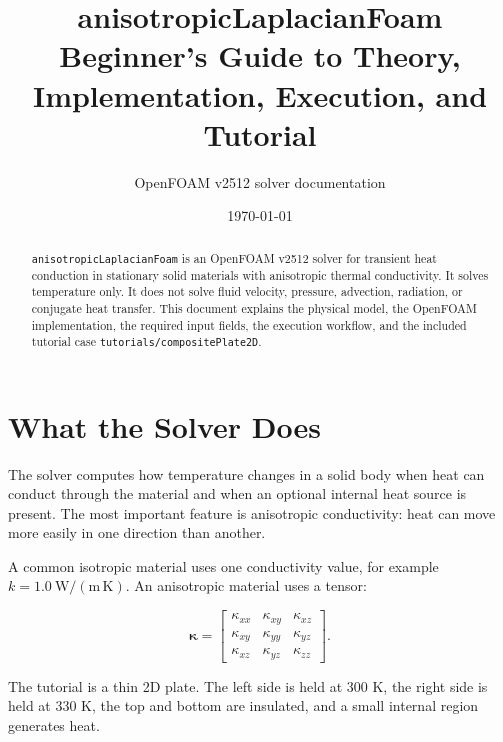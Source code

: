 \documentclass[11pt,a4paper]{article}
\title{\textbf{anisotropicLaplacianFoam}\\
Beginner's Guide to Theory, Implementation, Execution, and Tutorial}
\author{OpenFOAM v2512 solver documentation}
\date{\today}
\newcommand{\code}[1]{\texttt{#1}}
\newcommand{\kappatensor}{\boldsymbol{\kappa}}
\begin{document}
\maketitle

\begin{abstract}
\code{anisotropicLaplacianFoam} is an OpenFOAM v2512 solver for transient heat
conduction in stationary solid materials with anisotropic thermal conductivity.
It solves temperature only. It does not solve fluid velocity, pressure,
advection, radiation, or conjugate heat transfer. This document explains the
physical model, the OpenFOAM implementation, the required input fields, the
execution workflow, and the included tutorial case
\code{tutorials/compositePlate2D}.
\end{abstract}

\tableofcontents
\newpage

\section{What the Solver Does}

The solver computes how temperature changes in a solid body when heat can
conduct through the material and when an optional internal heat source is
present. The most important feature is anisotropic conductivity: heat can move
more easily in one direction than another.

A common isotropic material uses one conductivity value, for example
$k=1.0~\mathrm{W/(m\,K)}$. An anisotropic material uses a tensor:

\[
\kappatensor =
\begin{bmatrix}
\kappa_{xx} & \kappa_{xy} & \kappa_{xz} \\
\kappa_{xy} & \kappa_{yy} & \kappa_{yz} \\
\kappa_{xz} & \kappa_{yz} & \kappa_{zz}
\end{bmatrix}.
\]

The tutorial is a thin 2D plate. The left side is held at 300 K, the right side
is held at 330 K, the top and bottom are insulated, and a small internal region
generates heat.
\end{document}
